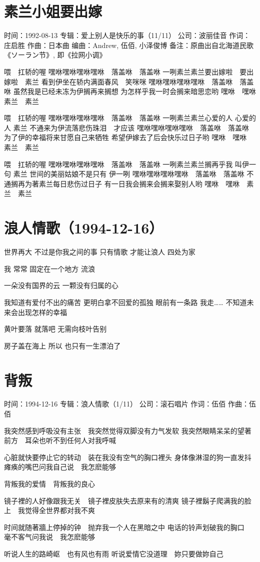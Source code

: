 \documentclass[UTF8,a4paper,oneside,twocolumn,12pt]{ctexbook}
\newcommand{\infopair}[2]{\textbullet #1：#2}
\newcommand{\zc}[1][伍佰]{\infopair{作词}{#1}}
\newcommand{\zq}[1][伍佰]{\infopair{作曲}{#1}}
\newcommand{\bq}[1][伍佰]{\infopair{编曲}{#1}}
\newcommand{\zj}[1]{\infopair{专辑}{#1}}
\newcommand{\sj}[1]{\infopair{时间}{#1}}
\newcommand{\bz}[1]{\infopair{备注}{#1}}
\newcommand{\gs}[1]{\infopair{公司}{#1}}
\newenvironment{info}{\begin{flushleft}\kaishu
	}
	{\end{flushleft}\normalsize\yahei\par}
\newenvironment{lyric}{
	}
{}
\begin{document}
\section{素兰小姐要出嫁}
\begin{info}
	\sj{1992-08-13}
	\zj{爱上别人是快乐的事（11/11）}
	\gs{波丽佳音}
	\zc[庄启胜]
	\zq[日本曲]
	\bq[Andrew, 伍佰, 小泽俊博]
	\bz{原曲出自北海道民歌《ソーラン节》, 即《拉网小调》}
\end{info}
\begin{lyric}
	喂　扛轿的喔
	嘿咻嘿咻嘿咻嘿咻　落盖咻　落盖咻
	一咧素兰素兰要出嫁啦　要出嫁啦　素兰
	看到伊坐在轿内满面春风　笑咪咪
	嘿咻嘿咻嘿咻嘿咻　落盖咻　落盖咻
	虽然我是已经未冻为伊搁再来搁想
	为怎样乎我一时会搁来暗思恋哟
	嘿咻　嘿咻　素兰　素兰

	喂　扛轿的喔
	嘿咻嘿咻嘿咻嘿咻　落盖咻　落盖咻
	一咧素兰素兰心爱的人 心爱的人 素兰
	不通来为伊流落悲伤珠泪　才应该
	嘿咻嘿咻嘿咻嘿咻　落盖咻　落盖咻
	为了伊的幸福将来甘愿自己来牺牲
	希望伊嫁去了后会快乐过日子哟
	嘿咻　嘿咻　素兰　素兰

	喂　扛轿的喔
	嘿咻嘿咻嘿咻嘿咻　落盖咻　落盖咻
	一咧素兰素兰搁再乎我 叫伊一句 素兰
	世间的美丽姑娘不是只有 伊一咧
	嘿咻嘿咻嘿咻嘿咻　落盖咻　落盖咻
	不通搁再为著素兰每日悲伤过日子
	有一日我会搁来会搁来娶别人哟
	嘿咻　嘿咻　素兰　素兰
\end{lyric}

\section*{浪人情歌（1994-12-16）}
世界再大 不过是你我之间的事
只有情歌 才能让浪人 四处为家

我 常常 固定在一个地方 流浪

一朵没有国界的云 一颗没有归属的心

我知道有爱付不出的痛苦
更明白拿不回爱的孤独
眼前有一条路 我走……
不知道未来会出现怎样的幸福

黄叶要落 就落吧
无需向枝叶告别

房子盖在海上 所以 也只有一生漂泊了

\section{背叛}
\begin{info}
	\sj{1994-12-16}
	\zj{浪人情歌（1/11）}
	\gs{滚石唱片}
	\zc
	\zq
\end{info}
\begin{lyric}
	我突然感到呼吸没有主张　我突然觉得双脚没有力气发软
	我突然眼睛呆呆的望著前方　耳朵也听不到任何人对我呼喊

	心脏就快要停止它的转动　装在我没有空气的胸口裡头
	身体像淋湿的狗一直发抖　瘫痪的嘴巴问我自己说　我怎麽能够

	背叛我的爱情　背叛我的良心

	镜子裡的人好像跟我无关　镜子裡皮肤失去原来有的清爽
	镜子裡鬍子爬满我的脸上　我觉得全世界都对我不爽

	时间就随著牆上停掉的钟　抛弃我一个人在黑暗之中
	电话的铃声划破我的胸口　毫不客气问我说　我怎麽能够

	听说人生的路崎岖　也有风也有雨
	听说爱情它没道理　妳只要做妳自己
\end{lyric}
\end{document}
